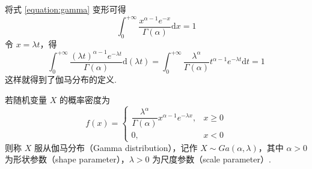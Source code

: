 将式 \eqref{equation:gamma} 变形可得
$$
\int_{0}^{+\infty} \dfrac{x^{\alpha - 1} e^{-x}}{\Gamma(\alpha)} \text{d}x = 1
$$
令 $x = \lambda t$，得
$$
\int_{0}^{+\infty} \dfrac{(\lambda t)^{\alpha - 1} e^{-\lambda t}}{\Gamma(\alpha)} \text{d}(\lambda t) = \int_{0}^{+\infty} \dfrac{\lambda^{\alpha}}{\Gamma(\alpha)} t^{\alpha - 1}  e^{-\lambda t} \text{d}t = 1
$$
这样就得到了伽马分布的定义.

\begin{definition}
    \indent 若随机变量 $X$ 的概率密度为
    $$
    f(x) = \begin{cases}
        \dfrac{\lambda^\alpha}{\Gamma(\alpha)} x^{\alpha - 1} e^{-\lambda x}, & x \geqslant 0 \\[0.5em]
        0, & x<0
    \end{cases}
    $$
    则称 $X$ 服从{\heiti 伽马分布}（Gamma distribution），记作 $X \sim Ga(\alpha,\lambda)$，其中 $\alpha > 0$ 为{\heiti 形状参数}（shape parameter），$\lambda > 0$ 为{\heiti 尺度参数}（scale parameter）.
\end{definition}

